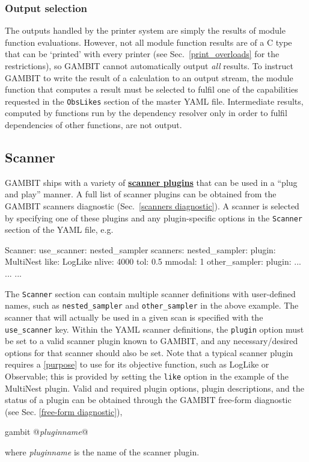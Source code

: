 \documentclass[pdftex,twocolumn,epjc3_preprint,runningheads]{svjour3}
\renewcommand{\_}{\discretionary{\underscore}{}{\underscore}}
\newcommand\yaml[1]{{\lstset{style=yaml}\lstinline!#1!\lstset{style=cpp}}}
\newcommand\yamlvalue[1]{{\YAMLvaluestyle\ttfamily#1}}
\newcommand\YAMLvaluestyle{\footnotesize\color{blue}\mdseries}
\newcommand{\cross}[1]{\ref{#1}}
\newcommand{\doublecross}[2]{\hyperref[#2]{\textbf{#1}}}
\newcommand{\metavarf}[1]{\textit{\color{darkgreen}\footnotesize\textrm{#1}}}
\newcommand{\metavar}{\metavarf}
\newcommand{\gambit}{\textsf{GAMBIT}\xspace}
\newcommand{\GB}{\gambit}
\newcommand\xx{\raisebox{0.2ex}{\smaller ++}\xspace}
\newcommand\Cpp{\textsf{C\xx}\xspace}
\newcommand\YAML{\textsf{YAML}\xspace}
\begin{document}
\subsubsection{Output selection}
The outputs handled by the printer system are simply the results of module function evaluations. However, not all module function results are of a \Cpp type that can be `printed' with every printer (see Sec.\ \ref{print_overloads} for the restrictions), so \GB cannot automatically output \emph{all} results. To instruct \GB to write the result of a calculation to an output stream, the module function that computes a result must be selected to fulfil one of the capabilities requested in the \yaml{ObsLikes} section of the master \YAML file. Intermediate results, computed by functions run by the dependency resolver only in order to fulfil dependencies of other functions, are not output.

\subsection{Scanner}
\label{scanner_yaml}
\GB ships with a variety of \doublecross{scanner plugins}{scanner plugin} that can be used in a ``plug and play'' manner.  A full list of scanner plugins can be obtained from the \GB scanners diagnostic (Sec.\ \ref{scanners diagnostic}).  A scanner is selected by specifying one of these plugins and any plugin-specific options in the \yaml{Scanner} section of the \YAML file, e.g.
\begin{lstyaml}
Scanner:
  use_scanner: nested_sampler
  scanners:
    nested_sampler:
      plugin: MultiNest
      like:  LogLike
      nlive: 4000
      tol: 0.5
      mmodal: 1
    other_sampler:
      plugin: ...
      ...
    ...
\end{lstyaml}
The \yaml{Scanner} section can contain multiple scanner definitions with user-defined names, such as \yaml{nested_sampler} and \yaml{other_sampler} in the above example.  The scanner that will actually be used in a given scan is specified with the \yaml{use_scanner} key.  Within the \YAML scanner definitions, the \yaml{plugin} option must be set to a valid scanner plugin known to \GB, and any necessary/desired options for that scanner should also be set.  Note that a typical scanner plugin requires a \cross{purpose} to use for its objective function, such as \yamlvalue{LogLike} or \yamlvalue{Observable}; this is provided by setting the \yaml{like} option in the example of the \yamlvalue{MultiNest} plugin.  Valid and required plugin options, plugin descriptions, and the status of a plugin can be obtained through the \GB free-form diagnostic (see Sec. \ref{free-form diagnostic}),
\begin{lstterm}
gambit @\metavar{plugin\_name}@
\end{lstterm}
where \metavar{plugin\_name} is the name of the scanner plugin.
\end{document}
